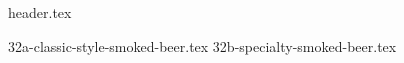 \clearpage
{}
\divisorLine

{header.tex}

\begin{multicols}{2}

{32a-classic-style-smoked-beer.tex}
{32b-specialty-smoked-beer.tex}

\end{multicols}